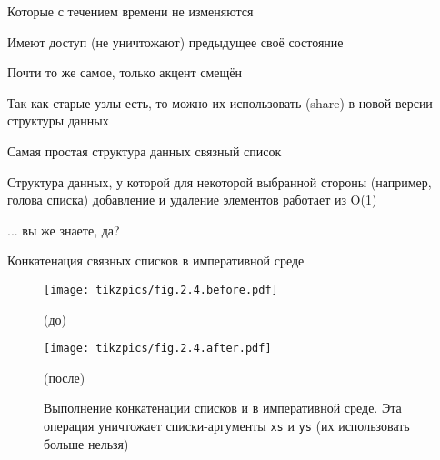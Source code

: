 \begin{frame}%
\begin{definition}
  Которые с течением времени не изменяются \faSmileO
\end{definition}

\vspace{1em}

\begin{definition}
Имеют доступ (не уничтожают) предыдущее своё состояние
\end{definition}
Почти то же самое, только акцент смещён\vspace{1em}

\begin{remark}
Так как старые узлы есть, то можно их использовать (share) в новой версии структуры данных
\end{remark}
\begin{definition}
\end{definition}
\end{frame}

\begin{frame}{Самая простая структура данных связный список}
\begin{definition}[Список]
Структура данных, у которой для некоторой выбранной стороны (например, голова списка) добавление и удаление элементов работает из O(1)
\end{definition}

\begin{definition}
... вы же знаете, да?

\end{definition}

\end{frame}

\begin{frame}{Конкатенация связных списков в императивной среде}
\begin{figure}[h]
  \texttt{[image: tikzpics/fig.2.4.before.pdf]}\par
	(до)\par\vspace{1em}
  \texttt{[image: tikzpics/fig.2.4.after.pdf]}\par
	(после)\par
	\caption{Выполнение конкатенации списков  и   в императивной среде. Эта операция уничтожает списки-аргументы \texttt{xs} и \texttt{ys} (их использовать больше нельзя)}
	\label{fig:2.4}
\end{figure}
\end{frame}


